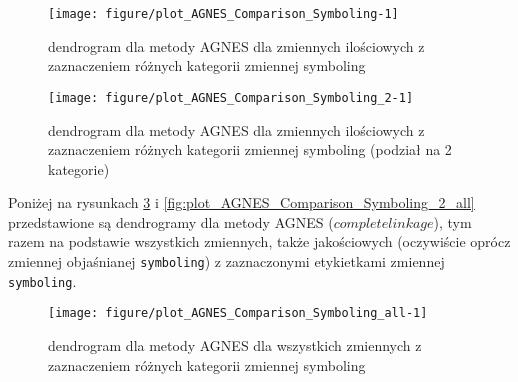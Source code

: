 \documentclass[12pt, a4paper]{article}\usepackage[]{graphicx}\usepackage[]{xcolor}
\makeatletter
\def\maxwidth{ %
  \ifdim\Gin@nat@width>\linewidth
    \linewidth
  \else
    \Gin@nat@width
  \fi
}
\newenvironment{knitrout}{}{} %
\makeatother
\begin{document}
\begin{knitrout}
\color{fgcolor}\begin{figure}[H]

{\centering \texttt{[image: figure/plot\_AGNES\_Comparison\_Symboling-1]} 

}

\caption[dendrogram dla metody AGNES dla zmiennych ilościowych z zaznaczeniem różnych kategorii zmiennej symboling]{dendrogram dla metody AGNES dla zmiennych ilościowych z zaznaczeniem różnych kategorii zmiennej symboling}\label{fig:plot_AGNES_Comparison_Symboling}
\end{figure}

\end{knitrout}

\begin{knitrout}
\color{fgcolor}\begin{figure}[H]

{\centering \texttt{[image: figure/plot\_AGNES\_Comparison\_Symboling\_2-1]} 

}

\caption[dendrogram dla metody AGNES dla zmiennych ilościowych z zaznaczeniem różnych kategorii zmiennej symboling (podział na 2 kategorie)]{dendrogram dla metody AGNES dla zmiennych ilościowych z zaznaczeniem różnych kategorii zmiennej symboling (podział na 2 kategorie)}\label{fig:plot_AGNES_Comparison_Symboling_2}
\end{figure}

\end{knitrout}

Poniżej na rysunkach \ref{fig:plot_AGNES_Comparison_Symboling_all} i \ref{fig:plot_AGNES_Comparison_Symboling_2_all} przedstawione są dendrogramy dla metody AGNES ($complete linkage$), tym razem na podstawie wszystkich zmiennych, także jakościowych (oczywiście oprócz zmiennej objaśnianej \texttt{symboling}) z zaznaczonymi etykietkami zmiennej \texttt{symboling}.

\begin{knitrout}
\color{fgcolor}\begin{figure}[H]

{\centering \texttt{[image: figure/plot\_AGNES\_Comparison\_Symboling\_all-1]} 

}

\caption[dendrogram dla metody AGNES dla wszystkich zmiennych z zaznaczeniem różnych kategorii zmiennej symboling]{dendrogram dla metody AGNES dla wszystkich zmiennych z zaznaczeniem różnych kategorii zmiennej symboling}\label{fig:plot_AGNES_Comparison_Symboling_all}
\end{figure}

\end{knitrout}
\end{document}
